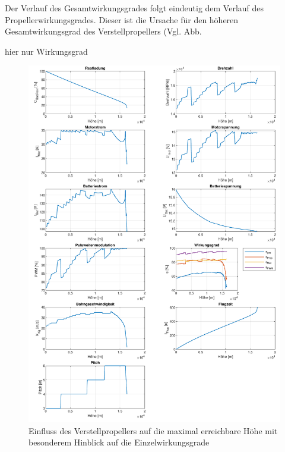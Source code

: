 \begin{appendix}
Der Verlauf des Gesamtwirkungsgrades folgt eindeutig dem Verlauf des Propellerwirkungsgrades. Dieser ist die Ursache für den höheren Gesamtwirkungsgrad des Verstellpropellers (Vgl. Abb.



hier nur Wirkungsgrad
\begin{figure}[H]
\centering
	\includegraphics[scale=0.7]{Diagramme/Verstellprop_eta.pdf}
	\caption{Einfluss des Verstellpropellers auf die maximal erreichbare Höhe mit besonderem Hinblick auf die Einzelwirkungsgrade}
	\label{abb:verstellprop_eta}
\end{figure}


\end{appendix}
